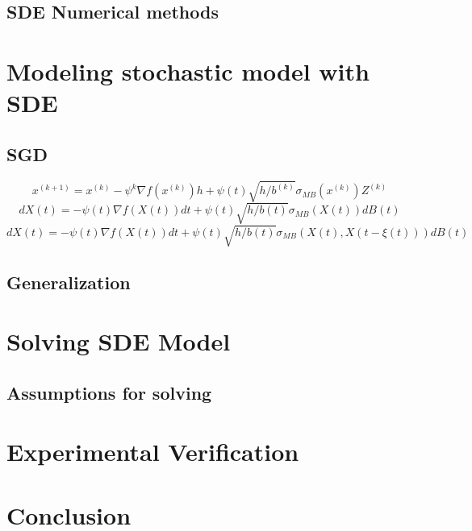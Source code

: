 \documentclass[12pt]{article}
\theoremstyle{definition}
\numberwithin{equation}{section}
\begin{document}
\subsection{SDE Numerical methods}

\section{Modeling stochastic model with SDE}
\subsection{SGD}
\begin{equation}
  x^{(k+1)} = x^{(k)} - \psi^k \nabla f(x^{(k)}) h +  \psi(t)\sqrt{h/b^{(k)}} \sigma_{MB}(x^{(k)})Z^{(k)}
\end{equation}
\begin{equation}
  dX(t) = -\psi(t)\nabla f(X(t))dt + \psi(t)\sqrt{h/b(t)} \sigma_{MB}(X(t))dB(t)
\end{equation}
\begin{equation}
  dX(t) = -\psi(t)\nabla f(X(t))dt + \psi(t)\sqrt{h/b(t)} \sigma_{MB}(X(t), X(t-\xi(t)))dB(t)
\end{equation}
\subsection{Generalization}
\section{Solving SDE Model}
\label{sec:SolvingSDEModel}
\subsection{Assumptions for solving}
\section{Experimental Verification} 
\label{sec:ExperimentalVerification}
\section{Conclusion}
\printbibliography
\end{document}
